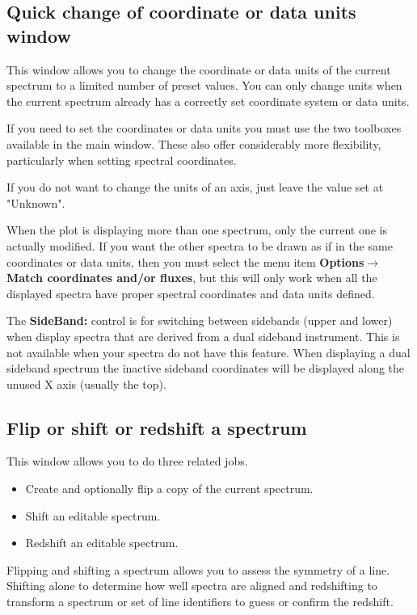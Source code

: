 \documentclass[twoside,11pt]{article}
\newcommand{\latexhtml}[2]{#1}
\renewcommand{\_}{\texttt{\symbol{95}}}
\newcommand{\submenuitem}[2]{\latexhtml{\textbf{#1$\rightarrow$#2}}{\textbf{#1->#2}}}
\newcommand{\labelitem}[1]{\textbf{#1}}
\begin{document}
\newpage
\subsection{Quick change of coordinate or data units window}

This window allows you to change the coordinate or data units of the current
spectrum to a limited number of preset values. You can only change units when
the current spectrum already has a correctly set coordinate system or data
units.

If you need to set the coordinates or data units you must use the two
toolboxes available in the main window. These also offer considerably more
flexibility, particularly when setting spectral coordinates.

If you do not want to change the units of an axis, just leave the value set at
"Unknown".

When the plot is displaying more than one spectrum, only the current one is
actually modified. If you want the other spectra to be drawn as if in the same
coordinates or data units, then you must select the menu item
\submenuitem{Options}{Match coordinates and/or fluxes}, but this will only
work when all the displayed spectra have proper spectral coordinates and data
units defined.

The \labelitem{SideBand:} control is for switching between sidebands (upper
and lower) when display spectra that are derived from a dual sideband
instrument. This is not available when your spectra do not have this feature.
When displaying a dual sideband spectrum the inactive sideband coordinates
will be displayed along the unused X axis (usually the top).

\newpage
\subsection{Flip or shift or redshift a spectrum}

This window allows you to do three related jobs.
\begin{itemize}
\item Create and optionally flip a copy of the current spectrum.
\item Shift an editable spectrum.
\item Redshift an editable spectrum.
\end{itemize}

Flipping and shifting a spectrum allows you to assess the symmetry of a
line. Shifting alone to determine how well spectra are aligned and redshifting
to transform a spectrum or set of line identifiers to guess or confirm the
redshift.
\end{document}
